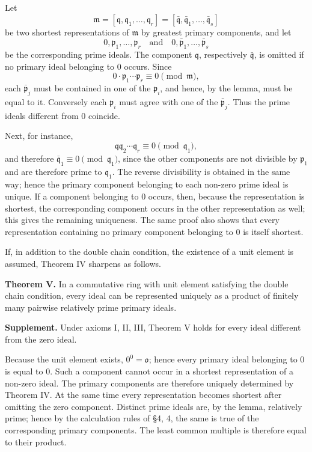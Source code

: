 \documentclass[11pt]{article}
\begin{document}
Let \[
  \mathfrak m=[\mathfrak q,\mathfrak q_1,\ldots,\mathfrak q_r]
      =[\bar{\mathfrak q},\bar{\mathfrak q}_1,\ldots,\bar{\mathfrak q}_s]
\] be two shortest representations of \(\mathfrak m\) by greatest
primary components, and let \[
  0,\mathfrak p_1,\ldots,\mathfrak p_r
  \quad\text{and}\quad
  0,\bar{\mathfrak p}_1,\ldots,\bar{\mathfrak p}_s
\] be the corresponding prime ideals. The component \(\mathfrak q\),
respectively \(\bar{\mathfrak q}\), is omitted if no primary ideal
belonging to \(0\) occurs. Since \[
  0\cdot \mathfrak p_1\cdots\mathfrak p_r\equiv0\pmod{\mathfrak m},
\] each \(\bar{\mathfrak p}_j\) must be contained in one of the
\(\mathfrak p_i\), and hence, by the lemma, must be equal to it.
Conversely each \(\mathfrak p_i\) must agree with one of the
\(\bar{\mathfrak p}_j\). Thus the prime ideals different from \(0\)
coincide.

Next, for instance, \[
  \mathfrak q\mathfrak q_2
\cdots \mathfrak q_r\equiv0\pmod{\mathfrak q_1},
\] and therefore \(\bar{\mathfrak q}_1\equiv0\pmod{\mathfrak q_1}\),
since the other components are not divisible by \(\mathfrak p_1\) and
are therefore prime to \(\mathfrak q_1\). The reverse divisibility is
obtained in the same way; hence the primary component belonging to each
non-zero prime ideal is unique. If a component belonging to \(0\)
occurs, then, because the representation is shortest, the corresponding
component occurs in the other representation as well; this gives the
remaining uniqueness. The same proof also shows that every
representation containing no primary component belonging to \(0\) is
itself shortest.

If, in addition to the double chain condition, the existence of a unit
element is assumed, Theorem IV sharpens as follows.

\textbf{Theorem V.} In a commutative ring with unit element satisfying
the double chain condition, every ideal can be represented uniquely as a
product of finitely many pairwise relatively prime primary ideals.

\textbf{Supplement.} Under axioms I, II, III, Theorem V holds for every
ideal different from the zero ideal.

Because the unit element exists, \(0^0=\mathfrak o\); hence every
primary ideal belonging to \(0\) is equal to \(0\). Such a component
cannot occur in a shortest representation of a non-zero ideal. The
primary components are therefore uniquely determined by Theorem IV. At
the same time every representation becomes shortest after omitting the
zero component. Distinct prime ideals are, by the lemma, relatively
prime; hence by the calculation rules of §4, 4, the same is true of the
corresponding primary components. The least common multiple is therefore
equal to their product.
\end{document}

